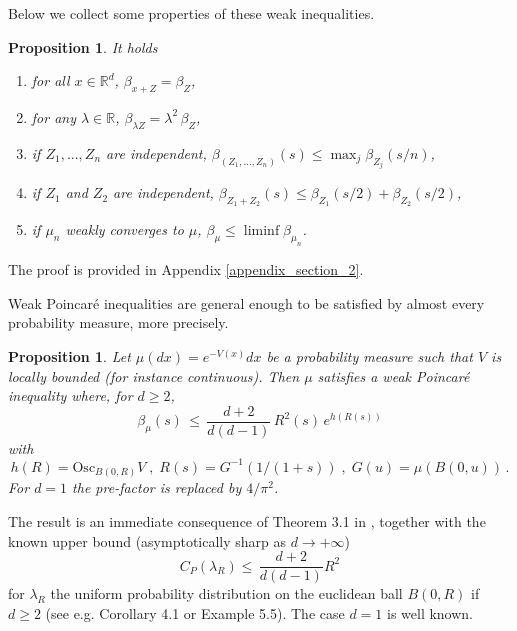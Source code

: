 \documentclass[11pt,reqno]{amsart}
\numberwithin{equation}{section}
\newtheorem{proposition}[theorem]{Proposition}
\theoremstyle{definition}
\theoremstyle{remark}
\def \Osc {\textrm{Osc}}
\begin{document}
  Below we collect some properties of these weak inequalities.
\begin{proposition}\label{proppropweakP}
It holds
\begin{enumerate}
\item[(1)] \quad for all $x \in \mathbb R^d$, $\beta_{x+Z} = \beta_Z$,
\item[(2)] \quad for any $\lambda \in \mathbb R$, $\beta_{\lambda Z}=\lambda^2 \, \beta_Z$,
\item[(3)] \quad if $Z_1,...,Z_n$ are independent, $\beta_{(Z_1,...,Z_n)}(s) \leq \max_j \beta_{Z_j}(s/n)$,
\item[(4)] \quad if $Z_1$ and $Z_2$ are independent, $\beta_{Z_1+Z_2}(s) \leq \beta_{Z_1}(s/2)+\beta_{Z_2}(s/2)$,
\item[(5)] \quad if $\mu_n$ weakly converges to $\mu$, $\beta_\mu \leq \liminf \beta_{\mu_n}$.
\end{enumerate}
\end{proposition}
The proof is provided in Appendix \ref{appendix_section_2}.

Weak Poincar\'e inequalities are general enough to be satisfied by almost every probability measure, more precisely.
\begin{proposition}\label{propWPgene}
Let $\mu(dx)=e^{-V(x)} dx$ be a probability measure such that $V$ is locally bounded (for instance continuous). Then $\mu$ satisfies a weak Poincar\'e inequality where, for $d\geq 2$, $$\beta_\mu(s) \, \leq \, \frac{d+2}{d(d-1)} \, R^2(s) \, e^{h(R(s))} $$ with $$h(R)=\Osc_{B(0,R)} V \; , \; R(s)=G^{-1}(1/(1+s)) \; , \; G(u) = \mu(B(0,u)) \, .$$ For $d=1$ the pre-factor is replaced by $4/\pi^2$.
\end{proposition}
The result is an immediate consequence of Theorem 3.1 in \cite{RW}, together with the known upper bound (asymptotically sharp as $d \to +\infty$) $$C_P(\lambda_R) \leq \, \frac{d+2}{d(d-1)} R^2$$ for $\lambda_R$ the uniform probability distribution on the euclidean ball $B(0,R)$ if $d\geq 2$ (see e.g. \cite{BJM} Corollary 4.1 or \cite{CGWradial} Example 5.5). The case $d=1$ is well known. 
\end{document}
